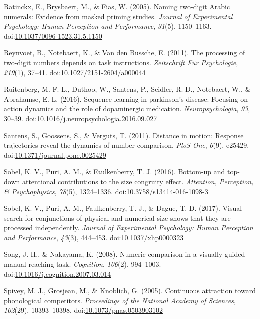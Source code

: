 \documentclass[english,man]{apa6}
\theoremstyle{definition}
\theoremstyle{definition}
\theoremstyle{definition}
\theoremstyle{remark}
\begin{document}
\hypertarget{ref-ratinckx2005}{}
Ratinckx, E., Brysbaert, M., \& Fias, W. (2005). Naming two-digit Arabic
numerals: Evidence from masked priming studies. \emph{Journal of
Experimental Psychology: Human Perception and Performance},
\emph{31}(5), 1150--1163.
doi:\href{https://doi.org/10.1037/0096-1523.31.5.1150}{10.1037/0096-1523.31.5.1150}

\hypertarget{ref-reynvoet2011}{}
Reynvoet, B., Notebaert, K., \& Van den Bussche, E. (2011). The
processing of two-digit numbers depends on task instructions.
\emph{Zeitschrift Für Psychologie}, \emph{219}(1), 37--41.
doi:\href{https://doi.org/10.1027/2151-2604/a000044}{10.1027/2151-2604/a000044}

\hypertarget{ref-ruitenberg2016}{}
Ruitenberg, M. F. L., Duthoo, W., Santens, P., Seidler, R. D.,
Notebaert, W., \& Abrahamse, E. L. (2016). Sequence learning in
parkinson's disease: Focusing on action dynamics and the role of
dopaminergic medication. \emph{Neuropsychologia}, \emph{93}, 30--39.
doi:\href{https://doi.org/10.1016/j.neuropsychologia.2016.09.027}{10.1016/j.neuropsychologia.2016.09.027}

\hypertarget{ref-santens2011}{}
Santens, S., Goossens, S., \& Verguts, T. (2011). Distance in motion:
Response trajectories reveal the dynamics of number comparison.
\emph{PloS One}, \emph{6}(9), e25429.
doi:\href{https://doi.org/10.1371/journal.pone.0025429}{10.1371/journal.pone.0025429}

\hypertarget{ref-sobel2016}{}
Sobel, K. V., Puri, A. M., \& Faulkenberry, T. J. (2016). Bottom-up and
top-down attentional contributions to the size congruity effect.
\emph{Attention, Perception, \& Psychophysics}, \emph{78}(5),
1324--1336.
doi:\href{https://doi.org/10.3758/s13414-016-1098-3}{10.3758/s13414-016-1098-3}

\hypertarget{ref-sobel2017}{}
Sobel, K. V., Puri, A. M., Faulkenberry, T. J., \& Dague, T. D. (2017).
Visual search for conjunctions of physical and numerical size shows that
they are processed independently. \emph{Journal of Experimental
Psychology: Human Perception and Performance}, \emph{43}(3), 444--453.
doi:\href{https://doi.org/10.1037/xhp0000323}{10.1037/xhp0000323}

\hypertarget{ref-songNakayama2008}{}
Song, J.-H., \& Nakayama, K. (2008). Numeric comparison in a
visually-guided manual reaching task. \emph{Cognition}, \emph{106}(2),
994--1003.
doi:\href{https://doi.org/10.1016/j.cognition.2007.03.014}{10.1016/j.cognition.2007.03.014}

\hypertarget{ref-spivey2005}{}
Spivey, M. J., Grosjean, M., \& Knoblich, G. (2005). Continuous
attraction toward phonological competitors. \emph{Proceedings of the
National Academy of Sciences}, \emph{102}(29), 10393--10398.
doi:\href{https://doi.org/10.1073/pnas.0503903102}{10.1073/pnas.0503903102}
\end{document}

